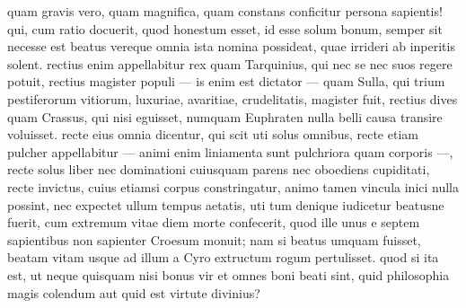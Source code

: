 
quam gravis vero, quam magnifica, quam constans conficitur persona sapientis! qui, cum ratio docuerit, quod honestum esset, id esse solum bonum, semper sit necesse est beatus vereque omnia ista nomina possideat, quae irrideri ab inperitis solent. rectius enim appellabitur rex quam Tarquinius, qui nec se nec suos regere potuit, rectius magister populi — is enim est dictator — quam Sulla, qui trium pestiferorum vitiorum, luxuriae, avaritiae, crudelitatis, magister fuit, rectius dives quam Crassus, qui nisi eguisset, numquam Euphraten nulla belli causa transire voluisset. recte eius omnia dicentur, qui scit uti solus omnibus, recte etiam pulcher appellabitur — animi enim liniamenta sunt pulchriora quam corporis —, recte solus liber nec dominationi cuiusquam parens nec oboediens cupiditati, recte invictus, cuius etiamsi corpus constringatur, animo tamen vincula inici nulla possint, nec expectet ullum tempus aetatis, uti tum denique iudicetur beatusne fuerit, cum extremum vitae diem morte confecerit, quod ille unus e septem sapientibus non sapienter Croesum monuit; nam si beatus umquam fuisset, beatam vitam usque ad illum a Cyro extructum rogum pertulisset. quod si ita est, ut neque quisquam nisi bonus vir et omnes boni beati sint, quid philosophia magis colendum aut quid est virtute divinius?
